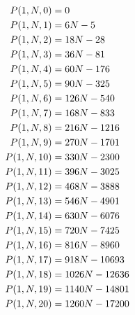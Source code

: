 ﻿\begin{align*}
    {P}(1,N,0) &= 0 \\
    {P}(1,N,1) &= 6N - 5 \\
    {P}(1,N,2) &= 18N - 28 \\
    {P}(1,N,3) &= 36N - 81 \\
    {P}(1,N,4) &= 60N - 176 \\
    {P}(1,N,5) &= 90N - 325 \\
    {P}(1,N,6) &= 126N - 540 \\
    {P}(1,N,7) &= 168N - 833 \\
    {P}(1,N,8) &= 216N - 1216 \\
    {P}(1,N,9) &= 270N - 1701 \\
    {P}(1,N,10) &= 330N - 2300 \\
    {P}(1,N,11) &= 396N - 3025 \\
    {P}(1,N,12) &= 468N - 3888 \\
    {P}(1,N,13) &= 546N - 4901 \\
    {P}(1,N,14) &= 630N - 6076 \\
    {P}(1,N,15) &= 720N - 7425 \\
    {P}(1,N,16) &= 816N - 8960 \\
    {P}(1,N,17) &= 918N - 10693 \\
    {P}(1,N,18) &= 1026N - 12636 \\
    {P}(1,N,19) &= 1140N - 14801 \\
    {P}(1,N,20) &= 1260N - 17200
\end{align*}

